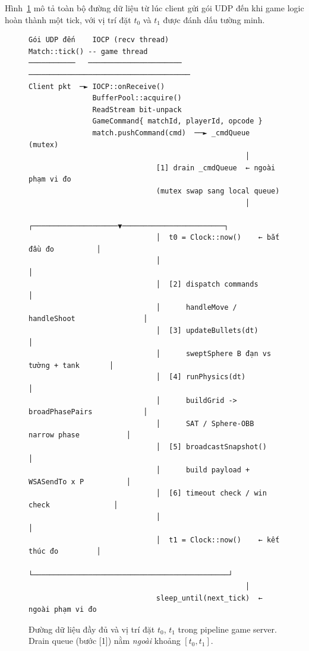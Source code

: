 \documentclass[12pt,a4paper]{report}
\begin{document}
Hình~\ref{fig:pipeline_measure} mô tả toàn bộ đường dữ liệu từ lúc client
gửi gói UDP đến khi game logic hoàn thành một tick, với vị trí đặt $t_0$ và $t_1$
được đánh dấu tường minh.

\begin{figure}[H]
\centering
{\scriptsize
\begin{verbatim}
Gói UDP đến    IOCP (recv thread)              Match::tick() -- game thread
───────────   ──────────────────────          ──────────────────────────────────────
Client pkt  ─► IOCP::onReceive()
               BufferPool::acquire()
               ReadStream bit-unpack
               GameCommand{ matchId, playerId, opcode }
               match.pushCommand(cmd)  ──► _cmdQueue (mutex)
                                                   │
                              [1] drain _cmdQueue  ← ngoài phạm vi đo
                              (mutex swap sang local queue)
                                                   │
                              ┌────────────────────▼────────────────────────┐
                              │  t0 = Clock::now()    ← bắt đầu đo          │
                              │                                              │
                              │  [2] dispatch commands                       │
                              │      handleMove / handleShoot                │
                              │  [3] updateBullets(dt)                       │
                              │      sweptSphere B đạn vs tường + tank       │
                              │  [4] runPhysics(dt)                          │
                              │      buildGrid -> broadPhasePairs            │
                              │      SAT / Sphere-OBB narrow phase           │
                              │  [5] broadcastSnapshot()                     │
                              │      build payload + WSASendTo x P          │
                              │  [6] timeout check / win check               │
                              │                                              │
                              │  t1 = Clock::now()    ← kết thúc đo         │
                              └──────────────────────────────────────────────┘
                                                   │
                              sleep_until(next_tick)  ← ngoài phạm vi đo
\end{verbatim}
}
\caption{Đường dữ liệu đầy đủ và vị trí đặt $t_0$, $t_1$ trong pipeline game server.
         Drain queue (bước [1]) nằm \emph{ngoài} khoảng $[t_0, t_1]$.}
\label{fig:pipeline_measure}
\end{figure}
\end{document}
